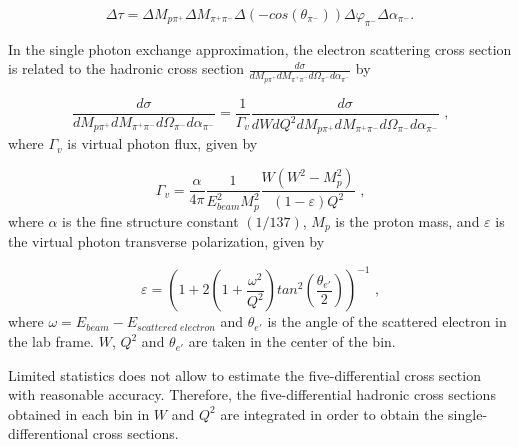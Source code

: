 \begin{equation}
\Delta \tau = \Delta M_{p\pi^{+}} \Delta
M_{\pi^{+}\pi^{-}} \Delta
(-cos(\theta_{\pi^{-}})) \Delta
\varphi_{\pi^{-}} \Delta \alpha_{\pi^{-}}.
\label{multibin}
\end{equation}


In the single photon exchange approximation,
the electron scattering cross section is related
to the hadronic cross section $\frac{d\sigma}{dM_{p\pi^{+}}dM_{\pi^{+}\pi^{-}}d\Omega_{\pi^{-}}
d\alpha_{\pi^{-}}}$ by

\begin{equation}
\frac{d\sigma}{dM_{p\pi^{+}}dM_{\pi^{+}\pi^{-}}d\Omega_{\pi^{-}}
d\alpha_{\pi^{-}}} = \frac{1}{\Gamma_{v}}
\frac{d\sigma}{dWdQ^{2}dM_{p\pi^{+}}dM_{\pi^{+}\pi^{-}}d\Omega_{\pi^{-}}
d\alpha_{\pi^{-}}}  \textrm{ ,}
\label{fulldiff}
\end{equation}
where $\Gamma_{v}$ is 
virtual photon flux, given by

\begin{equation}
\Gamma_{v} =
\frac{\alpha}{4\pi}\frac{1}{E_{beam}^{2}M_{p}^{2}}\frac{W(W^{2}-M_{p}^{2})}
{(1-\varepsilon)Q^{2}} \textrm{ ,}
\label{flux}
\end{equation}
where $\alpha$ is the fine structure constant $\left(1/137\right)$, $M_{p}$ is the proton
mass, and $\varepsilon$ is the virtual photon transverse polarization, given by

\begin{equation}
\varepsilon = \left( 1 + 2\left( 1 +
\frac{\omega^{2}}{Q^{2}} \right)
tan^{2}\left(\frac{\theta_{e'}}{2}\right) \right)^{-1} \textrm{ ,}
\label{polarization}
\end{equation}
where $\omega = E_{beam} - E_{scattered \,\, electron}$ and
$\theta_{e'}$ is the angle of the scattered electron in the
lab frame. $W$, $Q^{2}$ and $\theta_{e'}$ are
taken in the center of the bin.

Limited
statistics does not allow to estimate
the five-differential cross section with reasonable
accuracy. Therefore, the five-differential hadronic cross sections obtained in each bin in $W$ and $Q^2$ are integrated in order to obtain the single-differentional cross sections.


